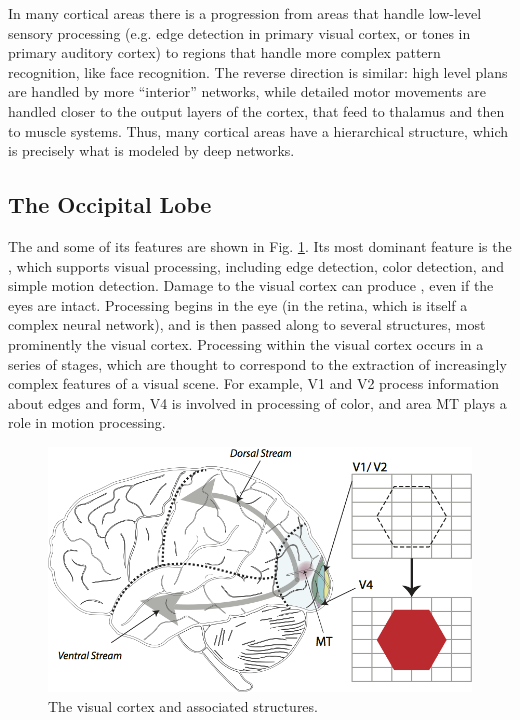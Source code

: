 In many cortical areas there is a progression from areas that handle low-level sensory processing (e.g. edge detection in primary visual cortex, or tones in primary auditory cortex) to regions that handle more complex pattern recognition, like face recognition. The reverse direction is similar: high level plans are handled by more ``interior'' networks, while detailed motor movements are handled closer to the output layers of the cortex, that feed to thalamus and then to muscle systems. Thus, many cortical areas have a hierarchical structure, which is precisely what is modeled by deep networks. 

\subsection{The Occipital Lobe}

The  and some of its features are shown in Fig. \ref{brain_vision}. Its most dominant feature is the , which supports visual processing, including edge detection, color detection, and simple motion detection. Damage to the visual cortex can produce , even if the eyes are intact. Processing begins in the eye (in the retina, which is itself a complex neural network), and is then passed along to several structures, most prominently the visual cortex. Processing within the visual cortex occurs in a series of stages, which are thought to correspond to the extraction of increasingly complex features of a visual scene. For example, V1 and V2  process information about edges and form, V4 is involved in processing of color, and area MT plays a role in motion processing. 

\begin{figure}[h]
\centering
\includegraphics[scale=.6]{./images/brain_vision.png}
\caption[Pamela Payne.]{The visual cortex and associated structures.}
\label{brain_vision}
\end{figure}

